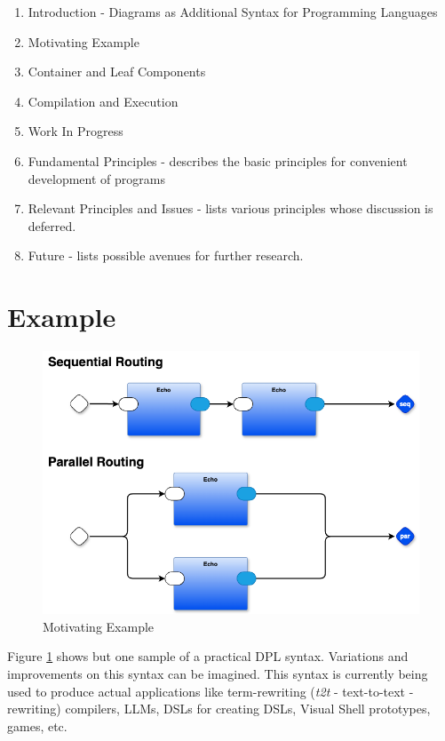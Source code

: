 \documentclass[10pt,anonymous,review]{acmart}
\begin{document}
\begin{enumerate}
\item Introduction - Diagrams as Additional Syntax for Programming
Languages

\item Motivating Example

\item Container and Leaf Components

\item Compilation and Execution

\item Work In Progress

\item Fundamental Principles - describes the basic principles
for convenient development of programs

\item Relevant Principles and Issues - lists various
principles whose discussion is deferred.

\item Future - lists possible avenues for further research.

\end{enumerate}

\section{Example}

  \begin{figure}[h]
    \centering
    \includegraphics[width=0.8\linewidth]{./media/HelloWorld0D.png}
    \caption{Motivating Example}
    \label{mot}
  \end{figure}

Figure \ref{mot} shows but one sample of a practical DPL syntax. Variations and
improvements on this syntax can be imagined. This syntax is currently being used
to produce actual applications like term-rewriting (\emph{t2t} -
text-to-text - rewriting) compilers, LLMs, DSLs for creating DSLs,
Visual Shell prototypes, games, etc.
\end{document}
